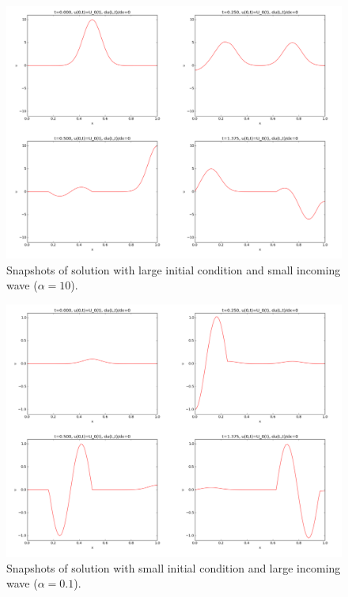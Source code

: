 \documentclass[graybox,envcountchap,sectrefs,final]{svmonodo}
\begin{document}
\begin{figure}[!ht]  %
  \centerline{\includegraphics[width=1.0\linewidth]{fig-scaling/gaussian_plus_incoming_alpha10.pdf}}
  \caption{
  Snapshots of solution with large initial condition and small incoming wave ($\alpha=10$). \label{scale:wave:pde2:fig:alpha10}
  }
\end{figure}



\begin{figure}[!ht]  %
  \centerline{\includegraphics[width=1.0\linewidth]{fig-scaling/gaussian_plus_incoming_alpha01.pdf}}
  \caption{
  Snapshots of solution with small initial condition and large incoming wave ($\alpha=0.1$). \label{scale:wave:pde2:fig:alpha01}
  }
\end{figure}
\end{document}
